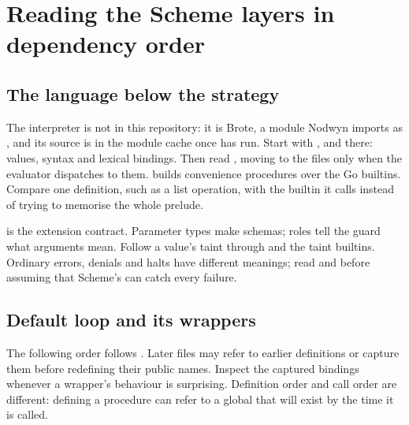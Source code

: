 \chapter{Reading the Scheme layers in dependency order}

\section{The language below the strategy}

The interpreter is not in this repository: it is Brote, a module Nodwyn
imports as , and its source is in the
module cache once  has run. Start with ,
 and  there: values, syntax and lexical bindings.
Then read , moving to the
 files only when the evaluator dispatches to them.
 builds convenience procedures over
the Go builtins. Compare one definition, such as a list operation, with
the builtin it calls instead of trying to memorise the whole prelude.

 is the extension contract. Parameter types
make schemas; roles tell the guard what arguments mean. Follow a value's
taint through  and the taint builtins.
Ordinary errors, denials and halts have different meanings; read
 and  before
assuming that Scheme's  can catch every failure.

\section{Default loop and its wrappers}

The following order follows . Later files may refer to
earlier definitions or capture them before redefining their public names.
Inspect the captured  bindings whenever a wrapper's behaviour
is surprising. Definition order and call order are different: defining a
procedure can refer to a global that will exist by the time it is called.

